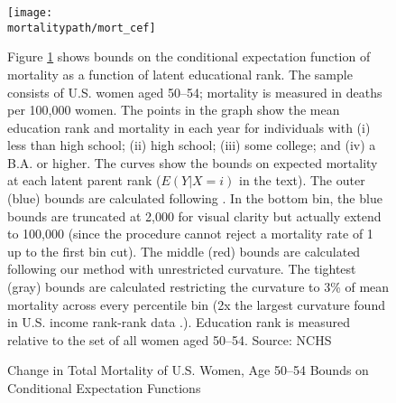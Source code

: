\begin{figure}[H]
\caption{Change in Total Mortality of U.S. Women, Age 50--54
  \cnewline Bounds on Conditional Expectation Functions}
\label{fig:mort_overlay}
\begin{center}
    \texttt{[image: \\mortalitypath/mort\_cef]}
\end{center}
\noindent
\footnotesize{Figure \ref{fig:mort_overlay} shows bounds on the
  conditional expectation function of mortality as a function of
  latent educational rank. The sample consists of U.S. women aged
  50--54; mortality is measured in deaths per 100,000 women. The
  points in the graph show the mean education rank and mortality in
  each year for individuals with (i) less than high school; (ii) high
  school; (iii) some college; and (iv) a B.A. or higher. The curves
  show the bounds on expected mortality at each latent parent rank
  ($E(Y|X=i)$ in the text). The outer (blue) bounds are calculated
  following \cite{Manski2002}. In the bottom bin, the blue bounds are
  truncated at 2,000 for visual clarity but actually extend to 100,000
  (since the procedure cannot reject a mortality rate of 1 up to the
  first bin cut). The middle (red) bounds are calculated following our method with unrestricted curvature. The tightest (gray) bounds are calculated restricting the curvature to 3\% of mean mortality across every percentile bin (2x the largest curvature found in U.S. income rank-rank data \citep{Chetty2016b}.). Education rank is measured relative to the set of all women aged 50--54. Source: NCHS}

\end{figure}
 
